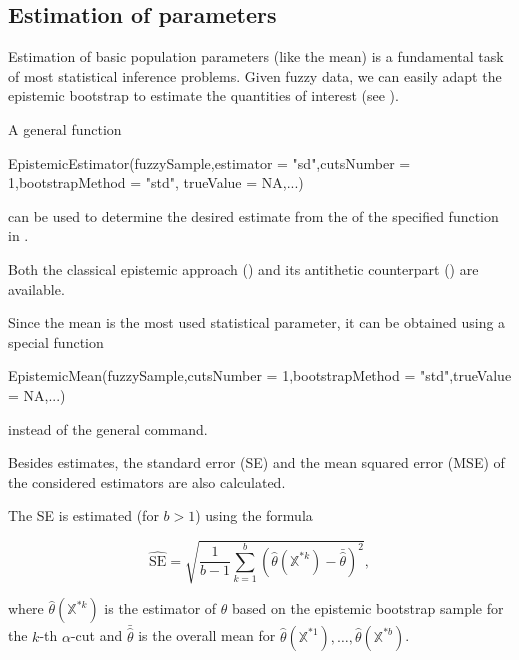 
\subsection{Estimation of parameters}

Estimation of basic population parameters (like the mean) is a fundamental task of most statistical inference problems. Given fuzzy data, we can easily adapt the epistemic bootstrap to estimate the quantities of interest (see  \citep{pgmr2022}).

A general function

\begin{example}
EpistemicEstimator(fuzzySample,estimator = "sd",cutsNumber = 1,bootstrapMethod = "std",
  trueValue = NA,...)
\end{example} 

can be used to determine the desired estimate from the  of the specified function in .

Both the classical epistemic approach () and its antithetic counterpart () are available.

Since the mean is the most used statistical parameter, it can be obtained using a special function

\begin{example}
EpistemicMean(fuzzySample,cutsNumber = 1,bootstrapMethod = "std",trueValue = NA,...)
\end{example}

instead of the general command.

Besides estimates, the standard error (SE) and the mean squared error (MSE) of the considered estimators are also calculated.

The SE is estimated (for $b >1$) using the formula

\begin{equation}
\label{frachetse}
	\widehat{\mathrm{SE}}=\sqrt{\frac{1}{b-1} \sum_{k=1}^{b} \left ( \hat{\theta} \left (\mathbb{X}^{*k} \right) - \bar{\hat{\theta}} \right )^2}  ,
\end{equation}

where $\hat{\theta} \left (\mathbb{X}^{*k} \right) $ is the estimator of $\theta$ based on the epistemic bootstrap sample for the $k$-th $\alpha$-cut and $\bar{\hat{\theta}}$ is the overall mean for $\hat{\theta} \left (\mathbb{X}^{*1} \right),\ldots,\hat{\theta} \left (\mathbb{X}^{*b} \right)$.

